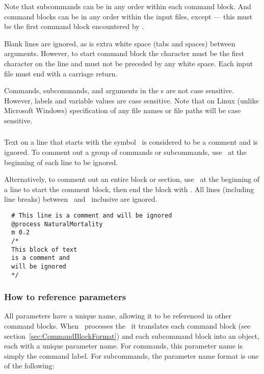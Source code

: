 Note that subcommands can be in any order within each command block. And command blocks can be in any order within the input files, except  --- this must be the first command block encountered by \CNAME.

Blank lines are ignored, as is extra white space (tabs and spaces) between arguments. However, to start command block the \command{} character must be the first character on the line and must not be preceded by any white space. Each input file must end with a carriage return.

Commands, subcommands, and arguments in the \config s are not case sensitive. However, labels and variable values are case sensitive. Note that on Linux (unlike Microsoft Windows) specification of any file names or file paths will be case sensitive.

\subsubsection{}

Text on a line that starts with the symbol \commentline\ is considered to be a comment and is ignored. To comment out a group of commands or subcommands, use \commentline\ at the beginning of each line to be ignored.

Alternatively, to comment out an entire block or section, use \commentstart\ at the beginning of a line to start the comment block, then end the block with \commentend. All lines (including line breaks) between \commentstart\ and \commentend\ inclusive are ignored.

\small{\begin{verbatim}
  # This line is a comment and will be ignored
  @process NaturalMortality
  m 0.2
  /* 
  This block of text
  is a comment and
  will be ignored
  */
\end{verbatim}}

\subsubsection{How to reference parameters\label{sec:parameter-names}}

All parameters have a unique name, allowing it to be referenced in other command blocks. When \CNAME\ processes the \config\ it translates each command block (see section~\ref{sec:CommandBlockFormat}) and each subcommand block into an object, each with a unique parameter name. For commands, this parameter name is simply the command label. For subcommands, the parameter name format is one of the following:

